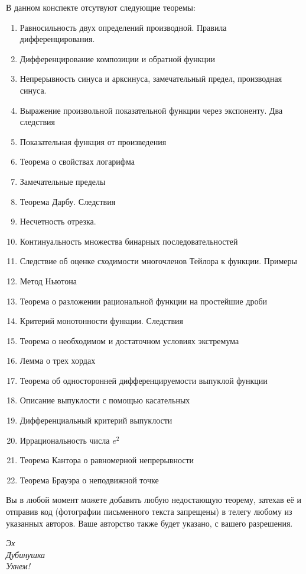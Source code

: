 \documentclass{article}
\begin{document}
В данном конспекте отсутвуют следующие теоремы:
\begin{enumerate}
\item Равносильность двух определений производной. Правила дифференцирования.
\item Дифференцирование композиции и обратной функции
\item Непрерывность синуса и арксинуса, замечательный предел, производная синуса.
\item Выражение произвольной показательной функции через экспоненту. Два следствия
\item Показательная функция от произведения
\item Теорема о свойствах логарифма
\item Замечательные пределы
\item Теорема Дарбу. Следствия
\item Несчетность отрезка.
\item Континуальность множества бинарных последовательностей
\item Следствие об оценке сходимости многочленов Тейлора к функции. Примеры
\item Метод Ньютона
\item Теорема о разложении рациональной функции на простейшие дроби
\item Критерий монотонности функции. Следствия
\item Теорема о необходимом и достаточном условиях экстремума
\item Лемма о трех хордах
\item Теорема об односторонней дифференцируемости выпуклой функции
\item Описание выпуклости с помощью касательных
\item Дифференциальный критерий выпуклости
\item Иррациональность числа $e^2$
\item Теорема Кантора о равномерной непрерывности
\item Теорема Брауэра о неподвижной точке
\end{enumerate}
Вы в любой момент можете добавить любую недостающую теорему, затехав её и отправив код (фотографии письменного текста запрещены) в телегу любому из указанных авторов. Ваше авторство также будет указано, с вашего разрешения.
\newpage

\begin{flushright}
\emph{Эх\\
Дубинушка\\
Ухнем!}
\end{flushright}
\end{document}
